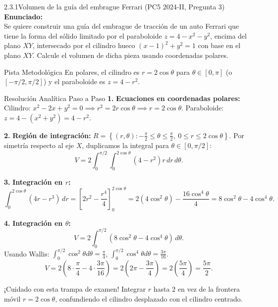 \documentclass[11pt,a4paper]{article}
\begin{document}
\begin{nivelbox}{2.3.1}{Volumen de la guía del embrague Ferrari (PC5 2024-II, Pregunta 3)}
\textbf{Enunciado:}\\
Se quiere construir una guía del embrague de tracción de un auto Ferrari que tiene la forma del sólido limitado por el paraboloide $z = 4 - x^2 - y^2$, encima del plano $XY$, intersecado por el cilindro hueco $(x-1)^2 + y^2 = 1$ con base en el plano $XY$. Calcule el volumen de dicha pieza usando coordenadas polares.

\begin{observacionbox}{Pista Metodológica}
En polares, el cilindro es $r = 2\cos\theta$ para $\theta \in [0, \pi]$ (o $[-\pi/2, \pi/2]$) y el paraboloide es $z = 4 - r^2$.
\end{observacionbox}

\begin{ejerciciobox}{Resolución Analítica Paso a Paso}
\smallskip\noindent\textbf{1.} \textbf{Ecuaciones en coordenadas polares:}
Cilindro: $x^2 - 2x + y^2 = 0 \implies r^2 = 2r\cos\theta \implies r = 2\cos\theta$.
Paraboloide: $z = 4 - (x^2+y^2) = 4 - r^2$.

\smallskip\noindent\textbf{2.} \textbf{Región de integración:}
$R = \left\{ (r,\theta) : -\frac{\pi}{2} \le \theta \le \frac{\pi}{2}, \ 0 \le r \le 2\cos\theta \right\}$. Por simetría respecto al eje $X$, duplicamos la integral para $\theta \in [0, \pi/2]$:
\[V = 2 \int_0^{\pi/2} \int_0^{2\cos\theta} (4 - r^2) r \, dr \, d\theta.\]

\smallskip\noindent\textbf{3.} \textbf{Integración en $r$:}
\[\int_0^{2\cos\theta} (4r - r^3) \, dr = \left[ 2r^2 - \frac{r^4}{4} \right]_0^{2\cos\theta} = 2(4\cos^2\theta) - \frac{16\cos^4\theta}{4} = 8\cos^2\theta - 4\cos^4\theta.\]

\smallskip\noindent\textbf{4.} \textbf{Integración en $\theta$:}
\[V = 2 \int_0^{\pi/2} (8\cos^2\theta - 4\cos^4\theta) \, d\theta.\]
Usando Wallis: $\int_0^{\pi/2} \cos^2\theta d\theta = \frac{\pi}{4}$, $\int_0^{\pi/2} \cos^4\theta d\theta = \frac{3\pi}{16}$.
\[V = 2 \left( 8 \cdot \frac{\pi}{4} - 4 \cdot \frac{3\pi}{16} \right) = 2 \left( 2\pi - \frac{3\pi}{4} \right) = 2 \left( \frac{5\pi}{4} \right) = \frac{5\pi}{2}.\]
\end{ejerciciobox}

\begin{errorbox}{¡Cuidado con esta trampa de examen!}
Integrar $r$ hasta $2$ en vez de la frontera móvil $r = 2\cos\theta$, confundiendo el cilindro desplazado con el cilindro centrado.
\end{errorbox}
\end{nivelbox}
\bigskip
\end{document}
